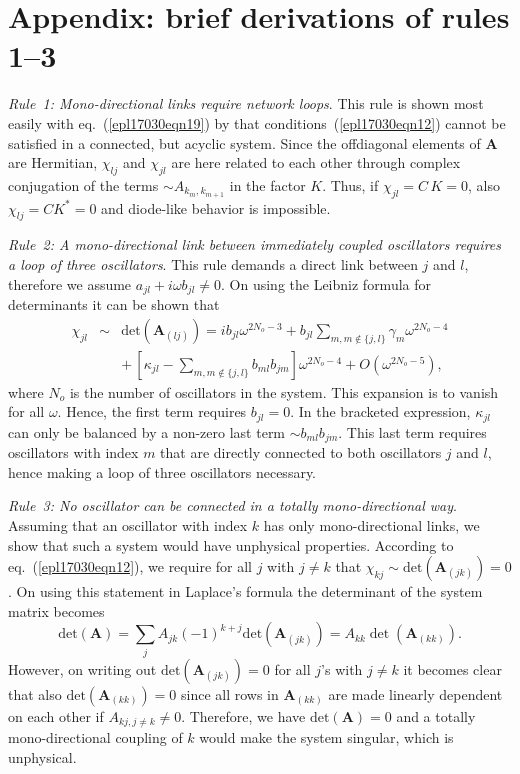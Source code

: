 \documentclass[doublecol,final,edchoice]{epl2}
\begin{document}
\section{Appendix: brief derivations of rules 1--3}

\textit{Rule~1: Mono-directional links require network loops}. This rule is shown most easily with eq.~(\ref{epl17030eqn19}) by  that conditions~(\ref{epl17030eqn12}) cannot be satisfied in a connected, but acyclic system. Since the offdiagonal elements of $\mathbf{A}$ are Hermitian, $\chi_{lj}$ and $\chi_{jl}$ are here related to each other through complex conjugation of the terms $\sim A_{k_m,k_{m+1}}$ in the factor $K$. Thus, if $\chi_{jl}=C\,K=0$, also $\chi_{lj}= C K^{*}=0$ and diode-like behavior is impossible.

\textit{Rule~2: A mono-directional link between immediately coupled oscillators requires a loop of three oscillators}. This rule demands a direct link between $j$ and $l$, therefore we assume $a_{jl}+i\omega b_{jl} \neq 0$. On using the Leibniz formula for determinants it can be shown that
\begin{eqnarray*}
\chi_{jl} &\sim& \mathrm{det}\left(\mathbf{A}_{(lj)}\right) = i b_{jl}\omega^{2N_o-3} + b_{jl} \sum_{m,m\notin\{j,l\}}\gamma_m \omega^{2N_o-4}\\
&&+\,\left[\kappa_{jl}-\sum_{m,m\notin\{j,l\}}b_{ml}b_{jm}\right] \omega^{2N_o-4} + O(\omega^{2N_o-5}),\label{eq_rule2_expansion}
\end{eqnarray*}
where $N_o$ is the number of oscillators in the system. This expansion is to vanish for all $\omega$. Hence, the first term requires $b_{jl}=0$. In the bracketed expression, $\kappa_{jl}$ can only be balanced by a non-zero last term $\sim b_{ml}b_{jm}$. This last term requires oscillators with index $m$ that are directly connected to both oscillators $j$ and $l$, hence making a loop of three oscillators necessary.

\textit{Rule~3: No oscillator can be connected in a totally mono-directional way}. Assuming that an oscillator with index $k$ has only mono-directional links, we show that such a system would have unphysical properties. According to eq.~(\ref{epl17030eqn12}), we require for all $j$ with $j\neq k$ that $\chi_{kj} \sim \mathrm{det}\left(\mathbf{A}_{(jk)}\right) = 0$. On using this statement in Laplace's formula the determinant of the system matrix becomes
\begin{equation*}
\mathrm{det}\left(\mathbf{A}\right) = \sum_{j} A_{jk} (-1)^{k+j}\mathrm{det}\left(\mathbf{A}_{(jk)}\right) = A_{kk} \det\left(\mathbf{A}_{(kk)}\right).
\end{equation*}
However, on writing out $\mathrm{det}\left(\mathbf{A}_{(jk)}\right) = 0$ for all $j$'s with $j\neq k$ it becomes clear that also $\mathrm{det}\left(\mathbf{A}_{(kk)}\right)=0$ since\vadjust{\vspace*{-4pt}\pagebreak} all rows in $\mathbf{A}_{(kk)}$ are made linearly dependent on each other if $A_{kj, j\neq k}\neq 0$. Therefore, we have $\mathrm{det}\left(\mathbf{A}\right)=0$ and a totally mono-directional coupling of $k$ would make the system singular, which is unphysical.
\end{document}
